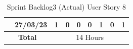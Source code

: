 \documentclass[12pt]{report}
\begin{document}
\begin{table}[h]
{\begin{tabular}{|cc|ccccccc|}
\rowcolor[HTML]{FFFFFF} 
\multicolumn{1}{|c|}{\cellcolor[HTML]{FFFFFF}\textbf{Testing}}                                                   & 27/03/23                                                           & \multicolumn{1}{c|}{\cellcolor[HTML]{FFFFFF}1}                                                                    & \multicolumn{1}{c|}{\cellcolor[HTML]{FFFFFF}0}                                                                  & \multicolumn{1}{c|}{\cellcolor[HTML]{FFFFFF}0}                                                                  & \multicolumn{1}{c|}{\cellcolor[HTML]{FFFFFF}0}                                                                  & \multicolumn{1}{c|}{\cellcolor[HTML]{FFFFFF}1}                                                                  & \multicolumn{1}{c|}{\cellcolor[HTML]{FFFFFF}0}                                                                  & \cellcolor[HTML]{FFFFFF}1                                                                  \\ \hline
\multicolumn{2}{|c|}{\textbf{Total}}                                                                                                                                                  & \multicolumn{7}{c|}{14   Hours}                                                                                                                                                                                                                                                                                                                                                                                                                                                                                                                                                                                                                                                                                                                                                                          \\ \hline
\end{tabular}
}
\caption{Sprint Backlog3 (Actual) User Story 8}
\label{tab:mytable}
\end{table}
\end{document}
